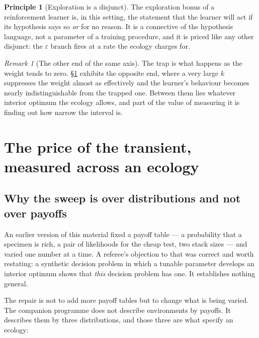 \documentclass[11pt,a4paper]{article}
\theoremstyle{plain}
\theoremstyle{definition}
\newtheorem{principle}[theorem]{Principle}
\theoremstyle{remark}
\newtheorem{remark}[theorem]{Remark}
\begin{document}
\begin{principle}[Exploration is a disjunct]\label{prin:explore}
The exploration bonus of a reinforcement learner is, in this setting, the
statement that the learner will act if its hypothesis says so \emph{or} for no
reason. It is a connective of the hypothesis language, not a parameter of a
training procedure, and it is priced like any other disjunct: the $\varepsilon$
branch fires at a rate the ecology charges for.
\end{principle}

\begin{remark}[The other end of the same axis]\label{rem:otherend}
The trap is what happens as the weight tends to zero. \S\ref{sec:robust} exhibits
the opposite end, where a very large $k$ suppresses the weight almost as
effectively and the learner's behaviour becomes nearly indistinguishable from the
trapped one. Between them lies whatever interior optimum the ecology allows, and
part of the value of measuring it is finding out how narrow the interval is.
\end{remark}

\section{The price of the transient, measured across an ecology}
\label{sec:robust}

\subsection{Why the sweep is over distributions and not over payoffs}

An earlier version of this material fixed a payoff table --- a probability that a
specimen is rich, a pair of likelihoods for the cheap test, two stack sizes ---
and varied one number at a time. A referee's objection to that was correct and
worth restating: a synthetic decision problem in which a tunable parameter
develops an interior optimum shows that \emph{this} decision problem has one. It
establishes nothing general.

The repair is not to add more payoff tables but to change what is being varied.
The companion programme does not describe environments by payoffs. It describes
them by three distributions, and those three are what specify an ecology:
\end{document}
